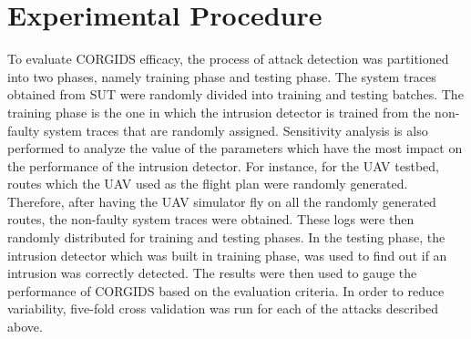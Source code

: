 \section{Experimental Procedure}
To evaluate \ac{CORGIDS} efficacy, the process of attack detection was partitioned  into two phases, namely training phase and testing phase. The system traces obtained from \ac{SUT} were randomly divided into training and testing batches. The training phase is the one in which the intrusion detector is trained from the non-faulty system traces that are randomly assigned. Sensitivity analysis is also performed to analyze the value of the parameters which have the most impact on the performance of the intrusion detector. For instance, for the \ac{UAV} testbed, routes which the \ac{UAV} used as the flight plan were randomly generated. Therefore, after having the \ac{UAV} simulator fly on all the randomly generated routes, the non-faulty system traces were obtained. These logs were then randomly distributed for training and testing phases. In the testing phase, the intrusion detector which was built in training phase, was used to find out if an intrusion was correctly detected. The results were then used to gauge the performance of \ac{CORGIDS} based on the evaluation criteria. In order to reduce variability, five-fold cross validation was run for each of the attacks described above.

\endinput
=====================================================================
